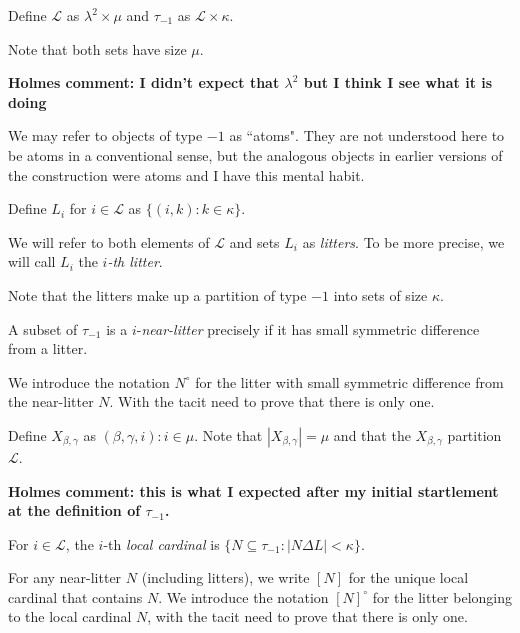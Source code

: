 \begin{definition}
\label {def:atom}
\leanok
{}
Define $\mathcal L$ as $ \lambda ^ 2 \times \mu$ and $\tau_{-1}$ as $\mathcal L \times \kappa$.

Note that both sets have size $\mu$.
\end{definition}

{\bf Holmes comment:  I didn't expect that $\lambda^2$ but I think I see what it is doing}

We may refer to objects of type $-1$ as ``atoms".  They are not understood here to be atoms in a conventional sense, but the analogous objects in earlier versions of the construction were atoms and I have this mental habit.

\begin{definition}
\label {def:litter}
\leanok
{}
Define $L_i$ for $i \in \mathcal L$ as $\{(i, k) : k \in \kappa\}$.

We will refer to both elements of $\mathcal L$ and sets $L_i$ as {\em litters}. To be more precise,
we will call $L_i$ the {\em $i$-th litter}.

Note that the litters make up a partition of type $-1$ into sets of size $\kappa$.
\end{definition}

\begin{definition}
\label {def:near-litter}
\leanok
{}
A subset of $\tau_{-1}$ is a $i$-{\em near-litter} precisely if it has small symmetric difference from  a litter.

We introduce the notation $N^\circ$ for the litter with small symmetric difference from the near-litter $N$.
With the tacit need to prove that there is only one.
\end{definition}

\begin{definition}
\label {def:ftargets}
\leanok
{}
Define $X_{\beta,\gamma}$ as ${(\beta, \gamma, i) : i \in \mu}$. Note that $|X_{\beta,\gamma}| = \mu$ and that the $X_{\beta,\gamma}$ partition $\mathcal L$.
\end{definition}

{\bf Holmes comment:  this is what I expected after my initial startlement at the definition of $\tau_{-1}$.}

\begin{definition}
\label {def:local-cardinal}
\leanok
For $i \in \mathcal L$, the $i$-th {\em local cardinal} is $\{N \subseteq \tau_{-1}:|N \Delta L|<\kappa\}$.

For any near-litter $N$ (including litters), we write $[N]$ for the unique local cardinal that contains $N$. We introduce the notation $[N]^\circ$ for the litter belonging to the local cardinal $N$, with the tacit need to prove that there is only one.
\end{definition}

